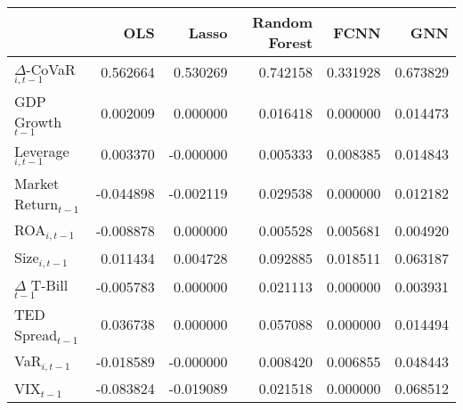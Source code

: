 \begin{tabular}{lrrrrr}
  \hline
 & OLS & Lasso & Random Forest & FCNN & GNN \\ 
  \hline
$\Delta$-CoVaR$_{i,t-1}$ & 0.562664 & 0.530269 & 0.742158 & 0.331928 & 0.673829 \\ 
  GDP Growth$_{t-1}$ & 0.002009 & 0.000000 & 0.016418 & 0.000000 & 0.014473 \\ 
  Leverage$_{i,t-1}$ & 0.003370 & -0.000000 & 0.005333 & 0.008385 & 0.014843 \\ 
  Market Return$_{t-1}$ & -0.044898 & -0.002119 & 0.029538 & 0.000000 & 0.012182 \\ 
  ROA$_{i,t-1}$ & -0.008878 & 0.000000 & 0.005528 & 0.005681 & 0.004920 \\ 
  Size$_{i,t-1}$ & 0.011434 & 0.004728 & 0.092885 & 0.018511 & 0.063187 \\ 
  $\Delta$ T-Bill$_{t-1}$ & -0.005783 & 0.000000 & 0.021113 & 0.000000 & 0.003931 \\ 
  TED Spread$_{t-1}$ & 0.036738 & 0.000000 & 0.057088 & 0.000000 & 0.014494 \\ 
  VaR$_{i,t-1}$ & -0.018589 & -0.000000 & 0.008420 & 0.006855 & 0.048443 \\ 
  VIX$_{t-1}$ & -0.083824 & -0.019089 & 0.021518 & 0.000000 & 0.068512 \\ 
   \hline
\end{tabular}
